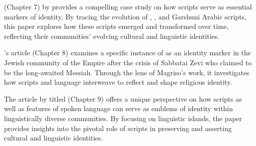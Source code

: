\documentclass[output=paper,colorlinks,citecolor=brown]{langscibook}
\begin{document}
 (Chapter 7)  by \citeauthor*{chapters/3.6_IFLMD_Mengozzi} provides a compelling case study on how scripts serve as essential markers of identity. By tracing the evolution of , , and Garshuni Arabic scripts, this paper explores how these scripts emerged and transformed over time, reflecting their communities' evolving cultural and linguistic identities.

\citeauthor*{chapters/3.7_IFLMD_Leibiusky}'s article  (Chapter 8) examines a specific instance of  as an identity marker in the Jewish community of the  Empire after the crisis of Sabbatai Zevi who claimed to be the long-awaited Messiah. Through the lens of Magriso's work, it investigates how scripts and language interweave to reflect and shape religious identity.

The article by \citeauthor*{chapters/3.8_IFLMD_Beridze} titled  (Chapter 9) offers a unique perspective on how scripts as well as features of spoken language can serve as emblems of identity within linguistically diverse communities. By focusing on  linguistic islands, the paper provides insights into the pivotal role of scripts in preserving and asserting cultural and linguistic identities.

\sloppy
\printbibliography[heading=subbibliography,notkeyword=this]
\end{document}
